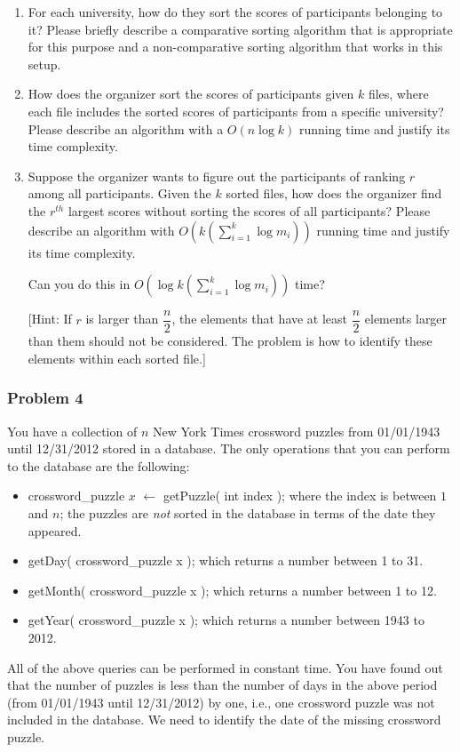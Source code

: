 \documentclass[11pt]{article}
\begin{document}
\begin{enumerate}

\item For each university, how do they sort the scores of participants
  belonging to it? Please briefly describe a comparative sorting
  algorithm that is appropriate for this purpose and a non-comparative
  sorting algorithm that works in this setup.

\item How does the organizer sort the scores of participants given $k$
  files, where each file includes the sorted scores of participants
  from a specific university?  Please describe an algorithm with a
  $O(n\log k)$ running time and justify its time complexity.

\item Suppose the organizer wants to figure out the participants of
  ranking $r$ among all participants. Given the $k$ sorted files, how
  does the organizer find the $r^{th}$ largest scores without sorting
  the scores of all participants?  Please describe an algorithm with
  $O(k (\sum_{i=1}^{k}\log m_{i}) )$ running time and justify its time
  complexity. 

Can you do this in $O(\log k(\sum_{i=1}^{k}\log m_{i}))$ time?

[Hint: If $r$ is larger than $\dfrac{n}{2}$, the elements that have at
  least $\dfrac{n}{2}$ elements larger than them should not be
  considered. The problem is how to identify these elements within
  each sorted file.]\\
  

\end{enumerate}


\subsubsection*{Problem 4} 

You have a collection of $n$ New York Times
crossword puzzles from 01/01/1943 until 12/31/2012 stored in a
database. The only operations that you can perform to the database are
the following:
\begin{itemize}
\item crossword\_puzzle $x$ $\leftarrow$ getPuzzle( int index ); where the
  index is between $1$ and $n$; the puzzles are \emph{not} sorted in the
  database in terms of the date they appeared.
\item getDay( crossword\_puzzle x ); which returns a number between 1
  to 31.
\item getMonth( crossword\_puzzle x ); which returns a number between
  1 to 12.
\item getYear( crossword\_puzzle x ); which returns a number between
  1943 to 2012.
\end{itemize}
All of the above queries can be performed in constant time. You have
found out that the number of puzzles is less than the number of days
in the above period (from 01/01/1943 until 12/31/2012) by one, i.e.,
one crossword puzzle was not included in the database. We need to
identify the date of the missing crossword puzzle.
\end{document}
